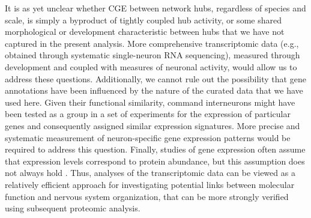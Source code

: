 \documentclass[10pt,letterpaper]{article}
\begin{document}
{It is as yet unclear whether CGE between network hubs, regardless of species and scale, is simply a byproduct of tightly coupled hub activity, or some shared morphological or development characteristic between hubs that we have not captured in the present analysis.
More comprehensive transcriptomic data (e.g., obtained through systematic single-neuron RNA sequencing), measured through development and coupled with measures of neuronal activity, would allow us to address these questions.
Additionally, we cannot rule out the possibility that gene annotations have been influenced by the nature of the curated data that we have used here.
Given their functional similarity, command interneurons might have been tested as a group in a set of experiments for the expression of particular genes and consequently assigned similar expression signatures.
More precise and systematic measurement of neuron-specific gene expression patterns would be required to address this question.
Finally, studies of gene expression often assume that expression levels correspond to protein abundance, but this assumption does not always hold \cite{Futcher1999, Greenbaum2003, Gygi1999}. 
Thus, analyses of the transcriptomic data can be viewed as a relatively efficient approach for investigating potential links between molecular function and nervous system organization, that can be more strongly verified using subsequent proteomic analysis.


}
\end{document}
